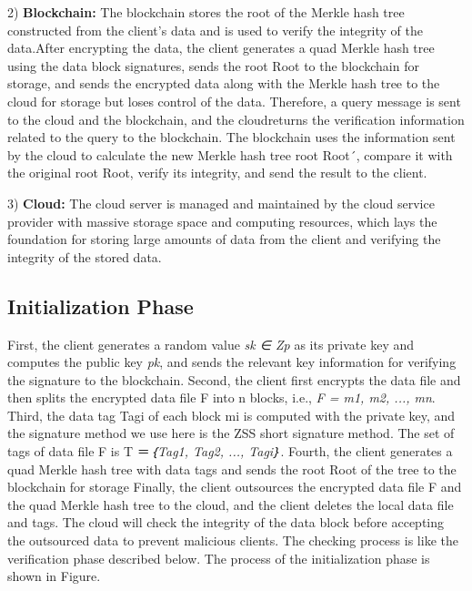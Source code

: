 2) \textbf{Blockchain: }The blockchain stores the root of the Merkle hash tree constructed from the client's data and is used to verify the integrity of the data.After encrypting the data, the client generates a quad Merkle hash tree using the data block signatures, sends the root Root to the blockchain for storage, and sends the encrypted data along with the Merkle hash tree to the cloud for storage but loses control of the data. 
Therefore, a query message is sent to the cloud and the blockchain, and the cloudreturns the verification information related to the query to the blockchain. The blockchain uses the information sent by the cloud to calculate the new Merkle hash tree root Root´, compare it with the original root Root, verify its integrity, and send the result to the client.

3) \textbf{Cloud:} The cloud server is managed and maintained by the cloud service provider with massive storage space and computing resources, which lays the foundation for storing large amounts of data from the client and verifying the integrity of the stored data.


\subsection{Initialization Phase}

First, the client generates a random value \textit{sk ∈ Zp} as its 
private key and computes the public key \textit{pk}, and sends the 
relevant key information for verifying the signature to the 
blockchain. 
Second, the client first encrypts the data file and then splits 
the encrypted data file F into n blocks, i.e., \textit{F = {m1, m2, ..., 
mn}}.
Third, the data tag Tagi of each block mi is computed with 
the private key, and the signature method we use here is the 
ZSS short signature method. The set of tags of data file F is T
＝\textit{｛Tag1, Tag2, ..., Tagi｝}.
Fourth, the client generates a quad Merkle hash tree with 
data tags and sends the root Root of the tree to the blockchain 
for storage
Finally, the client outsources the encrypted data file F and 
the quad Merkle hash tree to the cloud, and the client deletes 
the local data file and tags. The cloud will check the integrity 
of the data block before accepting the outsourced data to 
prevent malicious clients. The checking process is like the 
verification phase described below.
The process of the initialization phase is shown in Figure.

